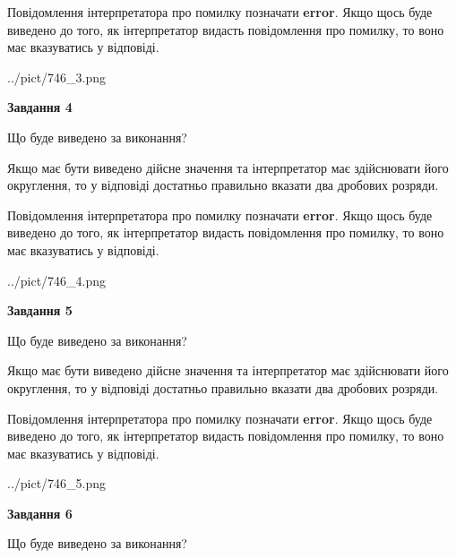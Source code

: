 \documentclass[12pt, ukrainian]{article}
\begin{document}
{\begin {Large}
Повідомлення інтерпретатора про помилку позначати \textbf{error}.
Якщо щось буде виведено до того, як інтерпретатор видасть повідомлення про помилку, 
то воно має вказуватись у відповіді. \par

\begin{center}
	{../pict/746_3.png}
\end{center}
\newpage

{\begin {center}\textbf{Завдання 4}\end {center}}\par
Що буде виведено за виконання? \par

Якщо має бути виведено дійсне значення та інтерпретатор має здійснювати його округлення, 
то у відповіді достатньо правильно вказати два дробових розряди.

Повідомлення інтерпретатора про помилку позначати \textbf{error}.
Якщо щось буде виведено до того, як інтерпретатор видасть повідомлення про помилку, 
то воно має вказуватись у відповіді. \par

\begin{center}
	{../pict/746_4.png}
\end{center}
\newpage

{\begin {center}\textbf{Завдання 5}\end {center}}\par
Що буде виведено за виконання? \par

Якщо має бути виведено дійсне значення та інтерпретатор має здійснювати його округлення, 
то у відповіді достатньо правильно вказати два дробових розряди.

Повідомлення інтерпретатора про помилку позначати \textbf{error}.
Якщо щось буде виведено до того, як інтерпретатор видасть повідомлення про помилку, 
то воно має вказуватись у відповіді. \par

\begin{center}
	{../pict/746_5.png}
\end{center}
\newpage

{\begin {center}\textbf{Завдання 6}\end {center}}\par
Що буде виведено за виконання? \par


\end{Large}}
\end{document}
